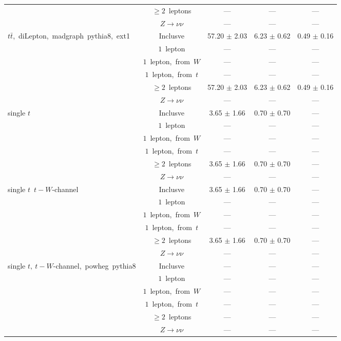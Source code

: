 \documentclass{article}
\begin{document}
\begin{longtable}{|l|c|c|c|c|}
 & $\ge2$~leptons  & ---  & ---  & --- \\* 
 & $Z\rightarrow\nu\nu$  & ---  & ---  & --- \\* 
\hline 
\multirow{6}{*}{$t\bar{t}$,~diLepton,~madgraph~pythia8,~ext1} & Inclusve  & 57.20 $\pm$ 2.03  & 6.23 $\pm$ 0.62  & 0.49 $\pm$ 0.16 \\* 
 & $1$~lepton  & ---  & ---  & --- \\* 
 & $1$~lepton,~from~$W$  & ---  & ---  & --- \\* 
 & $1$~lepton,~from~$t$  & ---  & ---  & --- \\* 
 & $\ge2$~leptons  & 57.20 $\pm$ 2.03  & 6.23 $\pm$ 0.62  & 0.49 $\pm$ 0.16 \\* 
 & $Z\rightarrow\nu\nu$  & ---  & ---  & --- \\* 
\hline 
\multirow{6}{*}{single $t$} & Inclusve  & 3.65 $\pm$ 1.66  & 0.70 $\pm$ 0.70  & --- \\* 
 & $1$~lepton  & ---  & ---  & --- \\* 
 & $1$~lepton,~from~$W$  & ---  & ---  & --- \\* 
 & $1$~lepton,~from~$t$  & ---  & ---  & --- \\* 
 & $\ge2$~leptons  & 3.65 $\pm$ 1.66  & 0.70 $\pm$ 0.70  & --- \\* 
 & $Z\rightarrow\nu\nu$  & ---  & ---  & --- \\* 
\hline 
\multirow{6}{*}{single $t$~$t-W$-channel} & Inclusve  & 3.65 $\pm$ 1.66  & 0.70 $\pm$ 0.70  & --- \\* 
 & $1$~lepton  & ---  & ---  & --- \\* 
 & $1$~lepton,~from~$W$  & ---  & ---  & --- \\* 
 & $1$~lepton,~from~$t$  & ---  & ---  & --- \\* 
 & $\ge2$~leptons  & 3.65 $\pm$ 1.66  & 0.70 $\pm$ 0.70  & --- \\* 
 & $Z\rightarrow\nu\nu$  & ---  & ---  & --- \\* 
\hline 
\multirow{6}{*}{single $t,~t-W$-channel,~powheg~pythia8} & Inclusve  & ---  & ---  & --- \\* 
 & $1$~lepton  & ---  & ---  & --- \\* 
 & $1$~lepton,~from~$W$  & ---  & ---  & --- \\* 
 & $1$~lepton,~from~$t$  & ---  & ---  & --- \\* 
 & $\ge2$~leptons  & ---  & ---  & --- \\* 
 & $Z\rightarrow\nu\nu$  & ---  & ---  & --- \\* 

\end{longtable}
\end{document}
